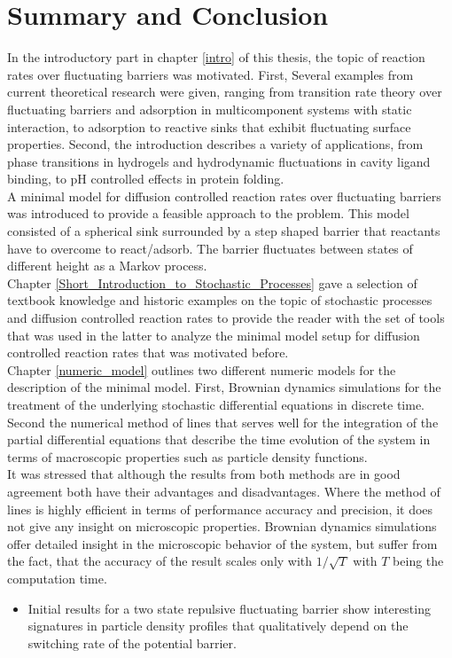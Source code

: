 \chapter{Summary and Conclusion}
\label{conclusion}

In the introductory part in chapter \ref{intro} of this thesis, the topic of reaction rates over fluctuating  barriers was motivated. First, Several examples from current theoretical research were given, ranging from transition rate theory over fluctuating barriers and adsorption in multicomponent systems with static interaction, to adsorption to reactive sinks that exhibit fluctuating surface properties. Second, the introduction describes a variety of applications, from phase transitions in hydrogels and hydrodynamic fluctuations in cavity ligand binding, to pH controlled effects in protein folding. \\
A minimal model for diffusion controlled reaction rates over fluctuating barriers was introduced to provide a feasible approach to the problem. This model consisted of a spherical sink surrounded by a step shaped barrier that reactants have to overcome to react/adsorb. The barrier fluctuates between states of different height as a Markov process.\\

Chapter \ref{Short_Introduction_to_Stochastic_Processes} gave a selection of textbook knowledge and historic examples on the topic of stochastic processes and diffusion controlled reaction rates to provide the reader with the set of tools that was used in the latter to analyze the minimal model setup for diffusion controlled reaction rates that was motivated before. \\ 

Chapter \ref{numeric_model} outlines two different numeric models for the description of the minimal model. First, Brownian dynamics simulations for the treatment of the underlying stochastic differential equations in discrete time. Second the numerical method of lines that serves well for the integration of the partial differential equations that describe the time evolution of the system in terms of macroscopic properties such as particle density functions.\\
It was stressed that although the results from both methods are in good agreement both have their advantages and disadvantages. Where the method of lines is highly efficient in terms of performance accuracy and precision, it does not give any insight on microscopic properties. Brownian dynamics simulations offer detailed insight in the microscopic behavior of the system, but suffer from the fact, that the accuracy of the result scales only with $1/\sqrt{T}$ with $T$ being the computation time.  \begin{itemize}
    \item Initial results for a two state repulsive fluctuating barrier show interesting signatures in particle density profiles that qualitatively depend on the switching rate of the potential barrier.
\end{itemize}

